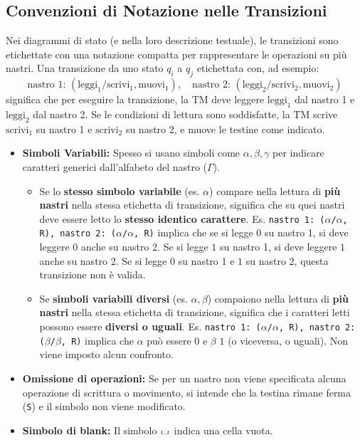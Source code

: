 \documentclass[a4paper]{article}
\theoremstyle{definition} %
\newcommand{\blankS}{\ensuremath{\raisebox{-0.15ex}{\scalebox{1.3}[0.7]{$\sqcup$}}\mkern2mu}}
\begin{document}
\subsection{Convenzioni di Notazione nelle Transizioni}
Nei diagrammi di stato (e nella loro descrizione testuale), le transizioni sono etichettate con una notazione compatta per rappresentare le operazioni su più nastri. Una transizione da uno stato $q_i$ a $q_j$ etichettata con, ad esempio:
\[ \text{nastro 1: } (\text{leggi}_1/\text{scrivi}_1, \text{muovi}_1), \quad \text{nastro 2: } (\text{leggi}_2/\text{scrivi}_2, \text{muovi}_2) \]
significa che per eseguire la transizione, la TM deve leggere $\text{leggi}_1$ dal nastro 1 e $\text{leggi}_2$ dal nastro 2. Se le condizioni di lettura sono soddisfatte, la TM scrive $\text{scrivi}_1$ su nastro 1 e $\text{scrivi}_2$ su nastro 2, e muove le testine come indicato.

\begin{itemize}
    \item \textbf{Simboli Variabili:} Spesso si usano simboli come $\alpha, \beta, \gamma$ per indicare caratteri generici dall'alfabeto del nastro ($\Gamma$).
    \begin{itemize}
        \item Se lo \textbf{stesso simbolo variabile} (es. $\alpha$) compare nella lettura di \textbf{più nastri} nella stessa etichetta di transizione, significa che su quei nastri deve essere letto lo \textbf{stesso identico carattere}. Es. \texttt{nastro 1: ($\alpha$/$\alpha$, R), nastro 2: ($\alpha$/$\alpha$, R)} implica che se si legge $0$ su nastro 1, si deve leggere $0$ anche su nastro 2. Se si legge $1$ su nastro 1, si deve leggere $1$ anche su nastro 2. Se si legge $0$ su nastro 1 e $1$ su nastro 2, questa transizione non è valida.
        \item Se \textbf{simboli variabili diversi} (es. $\alpha, \beta$) compaiono nella lettura di \textbf{più nastri} nella stessa etichetta di transizione, significa che i caratteri letti possono essere \textbf{diversi o uguali}. Es. \texttt{nastro 1: ($\alpha$/$\alpha$, R), nastro 2: ($\beta$/$\beta$, R)} implica che $\alpha$ può essere $0$ e $\beta$ $1$ (o viceversa, o uguali). Non viene imposto alcun confronto.
    \end{itemize}
    \item \textbf{Omissione di operazioni:} Se per un nastro non viene specificata alcuna operazione di scrittura o movimento, si intende che la testina rimane ferma (\texttt{S}) e il simbolo non viene modificato.
    \item \textbf{Simbolo di blank:} Il simbolo $\blankS$ indica una cella vuota.
\end{itemize}
\end{document}
